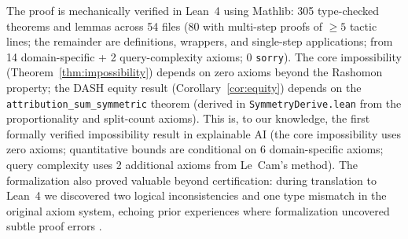 \documentclass{article}
\begin{document}
\begin{sloppypar}
The proof is mechanically verified in Lean~4 using Mathlib: 305 type-checked theorems
and lemmas across 54 files (80 with multi-step proofs of ${\geq}5$ tactic lines; the
remainder are definitions, wrappers, and single-step applications; from 14
domain-specific + 2 query-complexity axioms; 0 \texttt{sorry}).
The core impossibility (Theorem~\ref{thm:impossibility}) depends on zero axioms
beyond the Rashomon property; the DASH equity result (Corollary~\ref{cor:equity})
depends on the \texttt{attribution\_sum\_symmetric} theorem (derived in
\texttt{SymmetryDerive.lean} from the proportionality and split-count axioms).
This is, to our knowledge, the first formally verified impossibility result in
explainable AI (the core impossibility uses zero axioms; quantitative bounds are
conditional on 6 domain-specific axioms; query complexity uses 2 additional axioms
from Le~Cam's method).
The formalization also proved valuable beyond certification: during translation to
Lean~4 we discovered two logical inconsistencies and one type mismatch in the
original axiom system, echoing prior experiences where formalization uncovered subtle
proof errors \citep{nipkow2009social,zhang2026statistical}.
\end{sloppypar}
\end{document}
